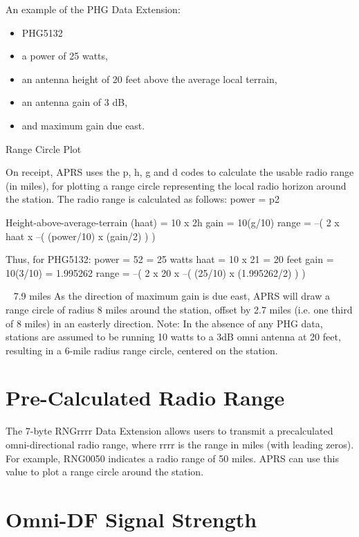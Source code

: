 An example of the PHG Data Extension:

\begin{itemize}
\item PHG5132
\end{itemize}

\begin{itemize}
means

\item a power of 25 watts,
\item an antenna height of 20 feet above the average local terrain,
\item an antenna gain of 3 dB,
\item and maximum gain due east.
\end{itemize}


Range Circle Plot

On receipt, APRS uses the p, h, g and d codes to calculate the usable radio
range (in miles), for plotting a range circle representing the local radio
horizon around the station. The radio range is calculated as follows:
power = p2

Height-above-average-terrain (haat) = 10 x 2h
gain = 10(g/10)
range = –( 2 x haat x –( (power/10) x (gain/2) ) )

Thus, for PHG5132:
power = 52 = 25 watts
haat = 10 x 21 = 20 feet
gain = 10(3/10) = 1.995262
range = –( 2 x 20 x –( (25/10) x (1.995262/2) ) )

~ 7.9 miles
As the direction of maximum gain is due east, APRS will draw a range circle
of radius 8 miles around the station, offset by 2.7 miles (i.e. one third of 8
miles) in an easterly direction.
Note: In the absence of any PHG data, stations are assumed to be running 10
watts to a 3dB omni antenna at 20 feet, resulting in a 6-mile radius range
circle, centered on the station.

\section {Pre-Calculated Radio Range}

The 7-byte RNGrrrr Data Extension allows users to transmit a precalculated omni-directional radio range, where rrrr is the range in miles
(with leading zeros).
For example, RNG0050 indicates a radio range of 50 miles.
APRS can use this value to plot a range circle around the station.

\section{Omni-DF Signal Strength}

